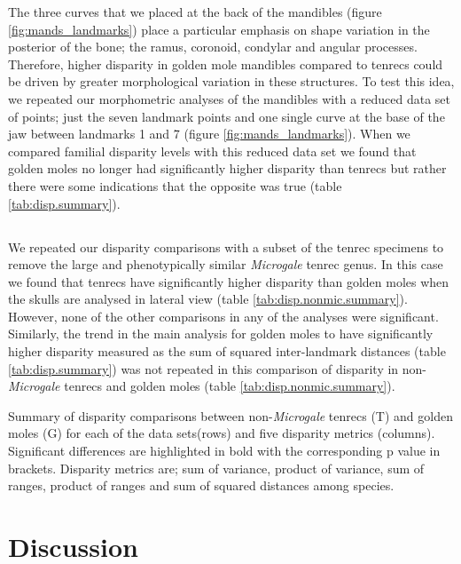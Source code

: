 	The three curves that we placed at the back of the mandibles (figure \ref{fig:mands_landmarks}) place a particular emphasis on shape variation in the posterior of the bone; the ramus, coronoid, condylar and angular processes. Therefore, higher disparity in golden mole mandibles compared to tenrecs could be driven by greater morphological variation in these structures. To test this idea, we repeated our morphometric analyses of the mandibles with a reduced data set of points; just the seven landmark points and one single curve at the base of the jaw between landmarks 1 and 7 (figure \ref{fig:mands_landmarks}). When we compared familial disparity levels with this reduced data set we found that golden moles no longer had significantly higher disparity than tenrecs but rather there were some indications that the opposite was true (table \ref{tab:disp.summary}).
	
\subsection{}
\label{sect:nonmic_gmoles} 	   
	
	We repeated our disparity comparisons with a subset of the tenrec specimens to remove the large and phenotypically similar \textit{Microgale} tenrec genus. In this case we found that tenrecs have significantly higher disparity than golden moles when the skulls are analysed in lateral view (table \ref{tab:disp.nonmic.summary}). However, none of the other comparisons in any of the analyses were significant. Similarly, the trend in the main analysis for golden moles to have significantly higher disparity measured as the sum of squared inter-landmark distances (table \ref{tab:disp.summary}) was not repeated in this comparison of disparity in non-\textit{Microgale} tenrecs and golden moles (table \ref{tab:disp.nonmic.summary}).
\bigskip
	\begin{table}[!htb]			
	\caption[Comparisons of disparity metrics for non- tenrecs and golden moles]
		{Summary of disparity comparisons between non-\textit{Microgale} tenrecs (T) and golden moles (G) for each of the data sets(rows) and five disparity metrics (columns). Significant differences are highlighted in bold with the corresponding p value in brackets. Disparity metrics are; sum of variance, product of variance, sum of ranges, product of ranges and sum of squared distances among species. }
	\centering
	 
	\label{tab:disp.nonmic.summary}  
	\end{table}


\section{Discussion}





